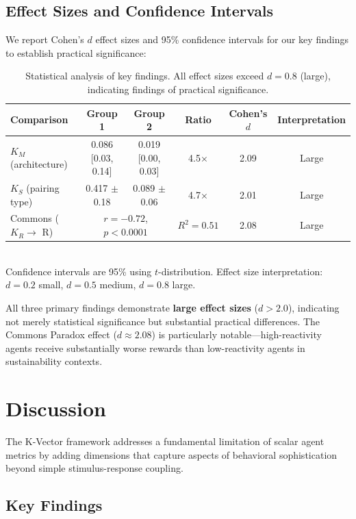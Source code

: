 \documentclass[11pt,a4paper]{article}
\newcommand{\kr}{K_R}
\newcommand{\km}{K_M}
\newcommand{\ks}{K_S}
\begin{document}
\subsection{Effect Sizes and Confidence Intervals}

We report Cohen's $d$ effect sizes and 95\% confidence intervals for our key findings to establish practical significance:

\begin{table}[h]
\centering
\caption{Statistical analysis of key findings. All effect sizes exceed $d = 0.8$ (large), indicating findings of practical significance.}
\label{tab:statistics}
\begin{tabular}{lccccc}
\toprule
\textbf{Comparison} & \textbf{Group 1} & \textbf{Group 2} & \textbf{Ratio} & \textbf{Cohen's $d$} & \textbf{Interpretation} \\
\midrule
$\km$ (architecture) & 0.086 [0.03, 0.14] & 0.019 [0.00, 0.03] & 4.5$\times$ & 2.09 & Large \\
$\ks$ (pairing type) & 0.417 $\pm$ 0.18 & 0.089 $\pm$ 0.06 & 4.7$\times$ & 2.01 & Large \\
Commons ($\kr \to$ R) & \multicolumn{2}{c}{$r = -0.72$, $p < 0.0001$} & $R^2 = 0.51$ & 2.08 & Large \\
\bottomrule
\end{tabular}
\\[1ex]
\footnotesize{Confidence intervals are 95\% using $t$-distribution. Effect size interpretation: $d = 0.2$ small, $d = 0.5$ medium, $d = 0.8$ large.}
\end{table}

All three primary findings demonstrate \textbf{large effect sizes} ($d > 2.0$), indicating not merely statistical significance but substantial practical differences. The Commons Paradox effect ($d \approx 2.08$) is particularly notable---high-reactivity agents receive substantially worse rewards than low-reactivity agents in sustainability contexts.

\section{Discussion}

The K-Vector framework addresses a fundamental limitation of scalar agent metrics by adding dimensions that capture aspects of behavioral sophistication beyond simple stimulus-response coupling.

\subsection{Key Findings}
\end{document}
